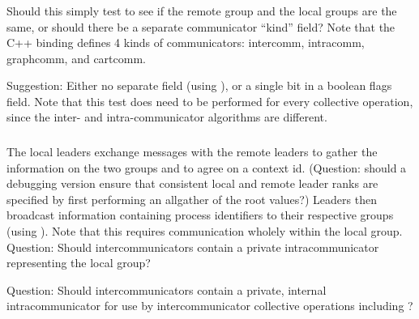 \documentclass{article}
\begin{document}
\subsubsection{}
Should this simply test to see if the remote group and the local groups are
the same, or should there be a separate communicator ``kind'' field?  Note
that the C++ binding defines 4 kinds of communicators: intercomm, intracomm,
graphcomm, and cartcomm. 

Suggestion: Either no separate field (using
 \code{==}
), or a single bit in a boolean flags field.  
Note that this test does need to be performed for every collective operation,
since the inter- and intra-communicator algorithms are different.

\subsubsection{}
The local leaders exchange messages with the remote leaders to gather the
information on the two groups and to agree on a context id.  (Question: should
a debugging version ensure 
that consistent local and remote leader ranks are specified by first
performing an allgather of the root values?)  
Leaders then broadcast information containing process identifiers to
their respective groups (using 
). Note that this requires communication wholely
within the local group.  Question: Should intercommunicators contain a
private intracommunicator representing the local group?

Question:  Should intercommunicators contain a private, internal
intracommunicator for use by intercommunicator collective operations including
?
\end{document}
